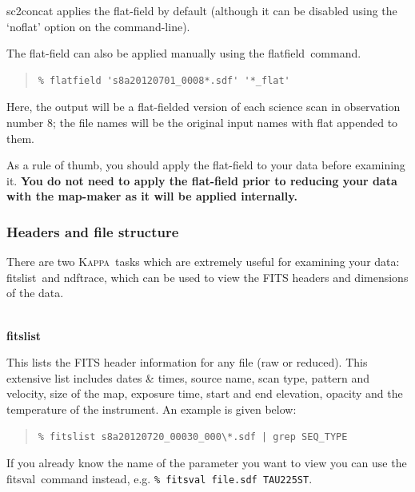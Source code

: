 \documentclass[twoside,11pt]{article}
\newcommand{\xref}[3]{#1}
\newcommand{\xlabel}[1]{}
\renewcommand{\_}{\texttt{\symbol{95}}}
\newenvironment{myquote}{\begin{quote}\begin{small}}{\end{small}\end{quote}}
\newcommand{\Kappa}{\xref{\textsc{Kappa}}{sun95}{}}
\newcommand{\task}[1]{\textsf{#1}}
\newcommand{\flatfield}{\xref{\task{flatfield}}{sun258}{FLATFIELD}}
\newcommand{\fitslist}{\xref{\task{fitslist}}{sun95}{FITSLIST}}
\newcommand{\fitsval}{\xref{\task{fitsval}}{sun95}{FITSVAL}}
\newcommand{\ndftrace}{\xref{\task{ndftrace}}{sun95}{NDFTRACE}}
\begin{document}
\task{sc2concat} applies the flat-field by default (although it can be
disabled using the `noflat' option on the command-line).

The flat-field can also be applied manually using the \flatfield\ command.

\begin{myquote}
\begin{verbatim}
% flatfield 's8a20120701_0008*.sdf' '*_flat'
\end{verbatim}
\end{myquote}
Here, the output will be a flat-fielded version of each science scan
in observation number 8; the file names will be the original input
names with \_flat appended to them.

As a rule of thumb, you should apply the flat-field to your data
before examining it. \textbf{You do not need to apply the flat-field
prior to reducing your data with the map-maker as it will be applied
internally.}



\subsubsection{\xlabel{header}Headers and file structure}
\label{sec:fitsheader}
There are two \Kappa\ tasks which are extremely useful for examining
your data: \fitslist\ and \ndftrace, which can be used to view the
FITS headers and dimensions of the data.
\\ \\
\begin{minipage}[t]{0.12\linewidth}
\textbf{fitslist}
\end{minipage}
\begin{minipage}[t]{0.85\linewidth}This lists the FITS header information
for any file (raw or reduced). This extensive list includes dates \& times,
source name, scan type, pattern and velocity, size of the map, exposure
time, start and end elevation, opacity and the temperature of the
instrument. An example is given below:
\begin{myquote}
\begin{verbatim}
% fitslist s8a20120720_00030_000\*.sdf | grep SEQ_TYPE
\end{verbatim}
\end{myquote}
If you already know the name of the parameter you want to view you can
use the \fitsval\ command instead, e.g.
\texttt{\% fitsval file.sdf TAU225ST}.\\
\end{minipage}
\end{document}
